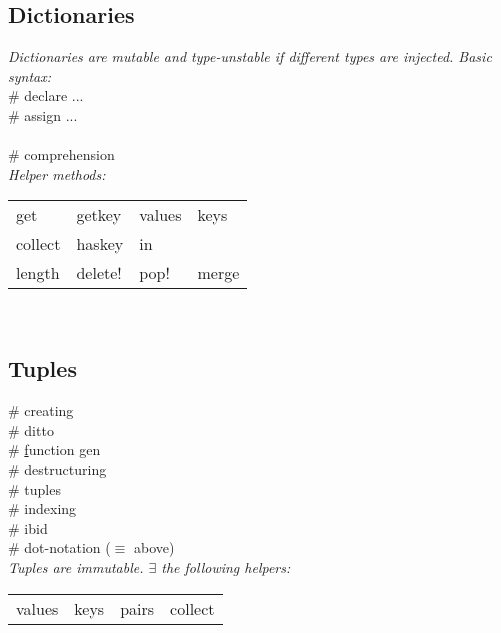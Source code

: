 \subsection*{Dictionaries}
\textit{Dictionaries are mutable and type-unstable if different types are injected. Basic syntax:}\\
 \# declare ...\\
 \# assign ... \\
 \\
\mycolX{35mm}{\code{[d(i)=value for (i,value)]}} \# comprehension \\
\textit{Helper methods:} \\
\begin{tabular}{l l l l}
    get     &    getkey  &       values         & keys \\
    collect    &       haskey         & in \\
    length  &   delete!    & pop!   & merge \\
\end{tabular} \


\subsection*{Tuples}
 \# creating \\
 \# ditto \\
 \# \underline{f}unction gen \\
 \# destructuring\\
 \#  tuples\\
 \# indexing \\
 \# ibid \\
 \# dot-notation ($\equiv$ above) \\
\textit{Tuples are immutable. $\exists$ the following helpers:}\\
\begin{tabular}{l l l l}
    values      & keys      & pairs    & collect \\
\end{tabular} \



